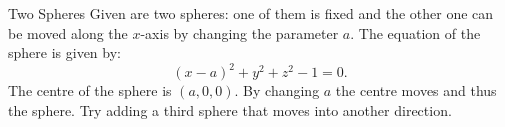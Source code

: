 \begin{surferPage}{Two Spheres}
Given are two spheres: one of them is fixed and the other one can be moved along the $x$-axis by changing the parameter $a$.
The equation of the sphere is given by:
\[(x-a)^2+y^2+z^2-1=0.\]
The centre of the sphere is $(a,0,0)$. By changing $a$ the centre moves and thus the sphere.
Try adding a third sphere that moves into another direction.
\end{surferPage}

